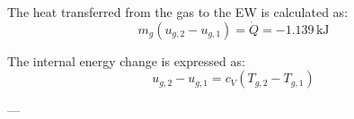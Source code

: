 The heat transferred from the gas to the EW is calculated as:  
\[
m_g (u_{g,2} - u_{g,1}) = \dot{Q} = -1.139 \, \text{kJ}
\]  

The internal energy change is expressed as:  
\[
u_{g,2} - u_{g,1} = c_V (T_{g,2} - T_{g,1})
\]  

---